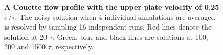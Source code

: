 \documentclass[preprint,12pt]{elsarticle}
\begin{document}
\begin{figure}
\centering
{}
\hskip 1cm
\vskip-0.2cm
\caption[]{\small {\bf A Couette flow profile with the upper plate velocity of 0.25 $\sigma/\tau$.} The noisy solution when 4 individual simulations are averaged is resolved by sampling 16 independent runs. Red lines denote the solution at 20 $\tau$; Green, blue and black lines are solutions at 100, 200 and 1500 $\tau$, respectively.}
\label{multiple_couette}
\end{figure}
\end{document}

